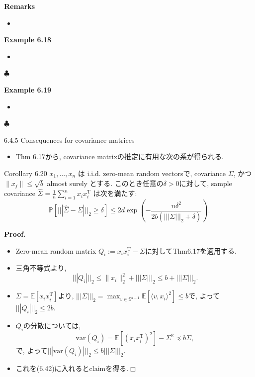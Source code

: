 \documentclass[unicode,aspectratio=169,11pt]{beamer}
\def\qed{\hfill $\Box$}
\def\endexample{\hfill $\clubsuit$}
\newcommand{\ex}{\mathbb{E}}
\newcommand{\var}{\mathrm{var}}
\newcommand{\bb}{\mathbb}
\newcommand{\tr}{\mathrm{T}}
\begin{document}
\begin{frame}{}{}
  {\bf Remarks}
  \begin{itemize}
    \item 
  \end{itemize}
\end{frame}

\begin{frame}{}{}
  {\bf Example 6.18}
  \begin{itemize}
    \item 
  \end{itemize}
  \endexample
\end{frame}

\begin{frame}{}{}
  {\bf Example 6.19}
  \begin{itemize}
    \item 
  \end{itemize}
  \endexample
\end{frame}

\begin{frame}{6.4.5 Consequences for covariance matrices}{}
  \begin{itemize}
    \item Thm 6.17から, covariance matrixの推定に有用な次の系が得られる.
  \end{itemize}
  \begin{block}{Corollary 6.20}
    $x_1, \dots, x_n$ は i.i.d. zero-mean random vectorsで, covariance $\Sigma$, かつ $\| x_j \| \le \sqrt{b}$ almost surely とする.
    このとき任意の$\delta > 0$に対して, sample covariance $\widehat{\Sigma} = \frac{1}{n}\sum_{i=1}^n x_i x_i^{\tr}$ は次を満たす:
    \[
      \mathbb{P}\left[|||\widehat{\Sigma} - \Sigma|||_{2} \geq \delta\right]
      \leq 2 d \exp \left(-\frac{n \delta^{2}}{2 b\left(|||\Sigma|||_{2}+\delta\right)}\right).
      \tag{6.49}
    \]
  \end{block}
\end{frame}

\begin{frame}{}{}
  {\bf Proof.}
  \begin{itemize}
    \item Zero-mean random matrix $Q_i := x_i x_i^\tr - \Sigma$に対してThm6.17を適用する.
    \item 三角不等式より,
          \[
            ||| Q_i |||_2 \le \| x_i\|_2^2 + |||\Sigma|||_2 \le b + |||\Sigma|||_2.
          \]
    \item $\Sigma = \ex[x_i x_i^\tr]$より, $||| \Sigma|||_2 = \max_{v \in \bb{S}^{d-1}}\ex[\langle v, x_i\rangle^2] \le b$で, よって$|||Q_i|||_2 \le 2b$.
    \item $Q_i$の分散については,
          \[
            \var(Q_i)
            = \ex[(x_ix_i^\tr)^2] - \Sigma^2
            \preceq b\Sigma,
          \]
          で, よって$||| \var(Q_i)|||_2 \le b|||\Sigma|||_2$.
    \item これを(6.42)に入れるとclaimを得る.\qed
  \end{itemize}
\end{frame}
\end{document}
